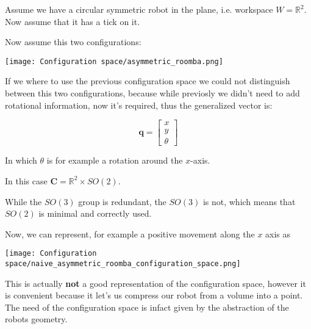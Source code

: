 \begin{example}
    Assume we have a circular symmetric robot in the plane, i.e. workspace $W = \mathbb{R}^2$. Now assume that it has a tick on it.

    Now assume this two configurations:

    \begin{center}
        \texttt{[image: Configuration space/asymmetric\_roomba.png]}
    \end{center}

    If we where to use the previous configuration space we could not distinguish between this two configurations, because while previosly we didn't need to add rotational information, now it's required, thus the generalized vector is:

    $$
        \bm{q} = \begin{bmatrix}
            x \\
            y \\
            \theta
        \end{bmatrix}
    $$

    In which $\theta$ is for example a rotation around the $x$-axis.

    \begin{tipbox}[Tip]
        In this case $\mathbf{C} = \mathbb{R}^2 \times SO(2)$.
    \end{tipbox}

    \begin{warningbox}[Warning]
        While the $SO(3)$ group is redundant, the $SO(3)$  is not, which means that $SO(2)$ is minimal and correctly used.
    \end{warningbox}

    Now, we can represent, for example a positive movement along the $x$ axis as

    \begin{center}
        \texttt{[image: Configuration space/naive\_asymmetric\_roomba\_configuration\_space.png]}
    \end{center}

    This is actually \textbf{not} a good representation of the configuration space, however it is convenient because it let's us compress our robot from a volume into a point.
    The need of the configuration space is infact given by the abstraction of the robots geometry.
\end{example}

